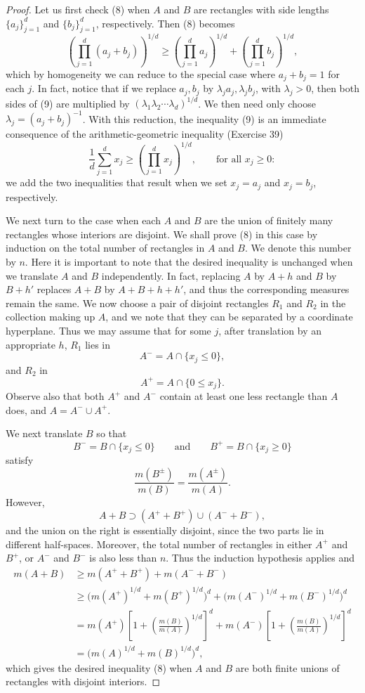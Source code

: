 \documentclass[11pt,openany]{book}
\begin{document}
\begin{proof}
Let us first check (8) when $A$ and $B$ are rectangles with side lengths $\{a_j\}_{j=1}^d$ and $\{b_j\}_{j=1}^d$, respectively. Then (8) becomes
\begin{equation}
 \left(\prod_{j=1}^d(a_j+b_j)\right)^{1/d}
 \ge
 \left(\prod_{j=1}^d a_j\right)^{1/d}
 +
 \left(\prod_{j=1}^d b_j\right)^{1/d},
 \tag{9}
\end{equation}
which by homogeneity we can reduce to the special case where $a_j+b_j=1$ for each $j$. In fact, notice that if we replace $a_j,b_j$ by $\lambda_j a_j,\lambda_j b_j$, with $\lambda_j>0$, then both sides of (9) are multiplied by $(\lambda_1\lambda_2\cdots\lambda_d)^{1/d}$. We then need only choose $\lambda_j=(a_j+b_j)^{-1}$. With this reduction, the inequality (9) is an immediate consequence of the arithmetic-geometric inequality (Exercise 39)
\[
 \frac1d\sum_{j=1}^d x_j
 \ge
 \left(\prod_{j=1}^d x_j\right)^{1/d},
 \qquad\text{for all }x_j\ge0:
\]
we add the two inequalities that result when we set $x_j=a_j$ and $x_j=b_j$, respectively.

We next turn to the case when each $A$ and $B$ are the union of finitely many rectangles whose interiors are disjoint. We shall prove (8) in this case by induction on the total number of rectangles in $A$ and $B$. We denote this number by $n$. Here it is important to note that the desired inequality is unchanged when we translate $A$ and $B$ independently. In fact, replacing $A$ by $A+h$ and $B$ by $B+h'$ replaces $A+B$ by $A+B+h+h'$, and thus the corresponding measures remain the same. We now choose a pair of disjoint rectangles $R_1$ and $R_2$ in the collection making up $A$, and we note that they can be separated by a coordinate hyperplane. Thus we may assume that for some $j$, after translation by an appropriate $h$, $R_1$ lies in
\[
 A^-=A\cap\{x_j\le0\},
\]
and $R_2$ in
\[
 A^+=A\cap\{0\le x_j\}.
\]
Observe also that both $A^+$ and $A^-$ contain at least one less rectangle than $A$ does, and $A=A^-\cup A^+$.

We next translate $B$ so that
\[
 B^-=B\cap\{x_j\le0\}
 \qquad\text{and}\qquad
 B^+=B\cap\{x_j\ge0\}
\]
satisfy
\[
 \frac{m(B^\pm)}{m(B)}=\frac{m(A^\pm)}{m(A)}.
\]
However,
\[
 A+B\supset(A^++B^+)\cup(A^-+B^-),
\]
and the union on the right is essentially disjoint, since the two parts lie in different half-spaces. Moreover, the total number of rectangles in either $A^+$ and $B^+$, or $A^-$ and $B^-$ is also less than $n$. Thus the induction hypothesis applies and
\[
\begin{aligned}
 m(A+B)
 &\ge m(A^++B^+)+m(A^-+B^-)\\
 &\ge\bigl(m(A^+)^{1/d}+m(B^+)^{1/d}\bigr)^d
   +\bigl(m(A^-)^{1/d}+m(B^-)^{1/d}\bigr)^d\\
 &=m(A^+)
 \left[1+\left(\frac{m(B)}{m(A)}\right)^{1/d}\right]^d
 +m(A^-)
 \left[1+\left(\frac{m(B)}{m(A)}\right)^{1/d}\right]^d\\
 &=\bigl(m(A)^{1/d}+m(B)^{1/d}\bigr)^d,
\end{aligned}
\]
which gives the desired inequality (8) when $A$ and $B$ are both finite unions of rectangles with disjoint interiors.


\end{proof}
\end{document}
